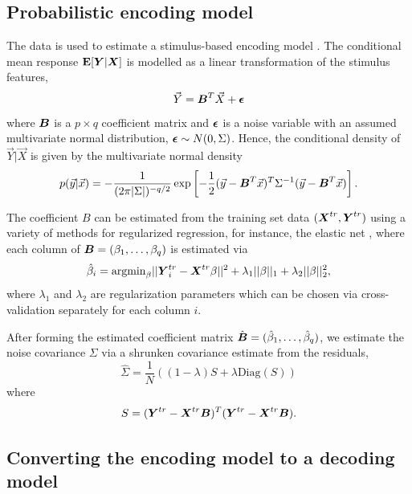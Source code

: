 \subsection{Probabilistic encoding model}

The data is used to estimate a stimulus-based encoding
model \cite{Kay2008a}\cite{Naselaris2011}\cite{Mitchell2008}.
The conditional mean response $\textbf{E}[\boldsymbol{Y}|\boldsymbol{X}]$ is modelled as
a linear transformation of the stimulus features,
\[
\vec{Y} = \boldsymbol{B}^T \vec{X} + \boldsymbol{\epsilon}
\]
where $\boldsymbol{B}$ is a $p \times q$ coefficient matrix and $\boldsymbol{\epsilon}$ is a
noise variable with an assumed multivariate normal distribution, $\boldsymbol{\epsilon} \sim N(0, \Sigma)$.  
Hence, the conditional density of $\vec{Y}|\vec{X}$ is given by the multivariate normal density
\[
p(\vec{y}|\vec{x}) = -\frac{1}{(2\pi |\Sigma|)^{-q/2}} \exp\left[-\frac{1}{2}(\vec{y} - \boldsymbol{B}^T \vec{x})^T \Sigma^{-1} (\vec{y}-\boldsymbol{B}^T \vec{x})\right].
\]

The coefficient $B$
can be estimated from the training set data $(\boldsymbol{X}^{tr}, \boldsymbol{Y}^{tr})$
using a variety of methods for regularized regression, for instance,
the elastic net \cite{Zou2005}, where each column of $\boldsymbol{B} =
(\beta_1,\hdots, \beta_q)$ is estimated via
\[
\hat{\beta}_i = \text{argmin}_\beta ||\boldsymbol{Y}_i^{tr} - \boldsymbol{X}^{tr} \beta||^2 + \lambda_1 ||\beta||_1 + \lambda_2 ||\beta||_2^2,
\]
where $\lambda_1$ and $\lambda_2$ are regularization parameters which
can be chosen via cross-validation \cite{Hastie2009a} separately for
each column $i$.

After forming the estimated coefficient matrix $\hat{\boldsymbol{B}} =
(\hat{\beta}_1,\hdots, \hat{\beta}_q)$, we estimate the noise
covariance $\Sigma$ via a shrunken covariance
estimate\cite{Ledoit2004}\cite{Daniels2001} from the residuals,
\[
\hat{\Sigma} = \frac{1}{N} ((1-\lambda) S + \lambda \text{Diag}(S)) 
\]
where
\[
S = (\boldsymbol{Y}^{tr} - \boldsymbol{X}^{tr} \boldsymbol{B})^T (\boldsymbol{Y}^{tr} - \boldsymbol{X}^{tr} \boldsymbol{B}).
\]

\subsection{Converting the encoding model to a decoding model}

